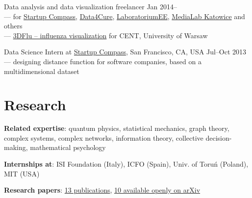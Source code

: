 \documentclass[margin,line]{resume}
\begin{document}
\begin{resume}
\begin{list2}
    \item Data analysis and data visualization freelancer  \hfill Jan 2014--\\
        --- for \href{http://compass.co}{Startup Compass}, \href{http://www.data4cure.com/}{Data4Cure}, \href{https://laboratorium.ee/en}{LaboratoriumEE}, \href{https://medialabkatowice.eu/en/}{MediaLab Katowice} and others\\
        --- \href{http://nucleus3d.cent.uw.edu.pl/influenza/}{3DFlu -- influenza visualization} for CENT, University of Warsaw

    \item Data Science Intern at \href{http://compass.co}{Startup Compass}, San Francisco, CA, USA \hfill Jul--Oct 2013\\
        --- designing distance function for software companies, based on a multidimensional dataset


    \end{list2}

    \section{\mysidestyle Research}

    \begin{list2}

    \item {\bf Related expertise}: quantum physics, statistical mechanics, graph theory, complex systems, complex networks, information theory, collective decision-making, mathematical psychology

    \item {\bf Internships at}: ISI Foundation (Italy), ICFO (Spain), Univ. of Toruń (Poland), MIT (USA)

    \item {\bf Research papers}: \href{http://scholar.google.com/citations?user=JUwBsPAAAAAJ&hl=en}{13 publications}, \href{http://arxiv.org/a/migdal\_p\_1}{10 available openly on arXiv}

    \end{list2}



\end{resume}
\end{document}
